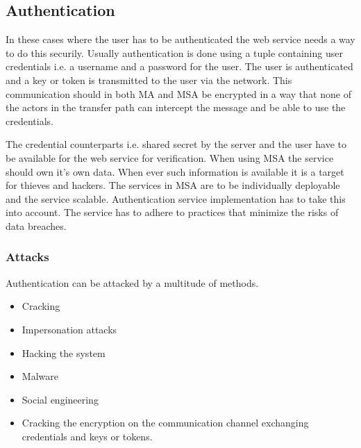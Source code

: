 \subsection{Authentication}
\begin{sloppypar}
    In these cases where the user has to be authenticated the web service needs 
    a way to do this securily. Usually authentication is done using a tuple 
    containing user credentials i.e. a username and a password for the user. The
    user is authenticated and a key or token is transmitted to the user via the 
    network. This communication should in both MA and MSA be encrypted in a way 
    that none of the actors in the transfer path can intercept the message and 
    be able to use the credentials.
\end{sloppypar}

\begin{sloppypar}
    The credential counterparts i.e. shared secret by the server and the user 
    have to be available for the web service for verification. When using MSA 
    the service should own it's own data. When ever such information is 
    available it is a target for thieves and hackers. The services in MSA are 
    to be individually deployable and the service scalable. Authentication 
    service implementation has to take this into account. The service has to 
    adhere to practices that minimize the risks of data breaches. 
\end{sloppypar}
    
\subsubsection{Attacks}
\begin{sloppypar}
    Authentication can be attacked by a multitude of methods.     
    \begin{itemize}
        \item Cracking
        \item Impersonation attacks
        \item Hacking the system
        \item Malware
        \item Social engineering
        \item Cracking the encryption on the communication channel exchanging credentials and keys or tokens.
    \end{itemize}
\end{sloppypar}

